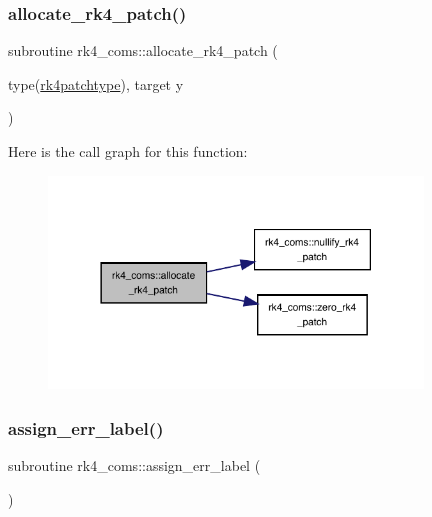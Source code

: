 \subsubsection{\texorpdfstring{allocate\+\_\+rk4\+\_\+patch()}{allocate\_rk4\_patch()}}
{\footnotesize\ttfamily subroutine rk4\+\_\+coms\+::allocate\+\_\+rk4\+\_\+patch (\begin{DoxyParamCaption}\item[{type(\hyperlink{structrk4__coms_1_1rk4patchtype}{rk4patchtype}), target}]{y }\end{DoxyParamCaption})}

Here is the call graph for this function\+:
\nopagebreak
\begin{figure}[H]
\begin{center}
\leavevmode
\includegraphics[width=282pt]{namespacerk4__coms_a52256ca0348235c95a467581d6067dac_cgraph}
\end{center}
\end{figure}
\mbox{\label{namespacerk4__coms_ae49c70a18c8dfa81befa51bc5244ab8c}} 
\subsubsection{\texorpdfstring{assign\+\_\+err\+\_\+label()}{assign\_err\_label()}}
{\footnotesize\ttfamily subroutine rk4\+\_\+coms\+::assign\+\_\+err\+\_\+label (\begin{DoxyParamCaption}{ }\end{DoxyParamCaption})}

\mbox{\label{namespacerk4__coms_a38274254cb16401c20124f7620f64ab2}} 
